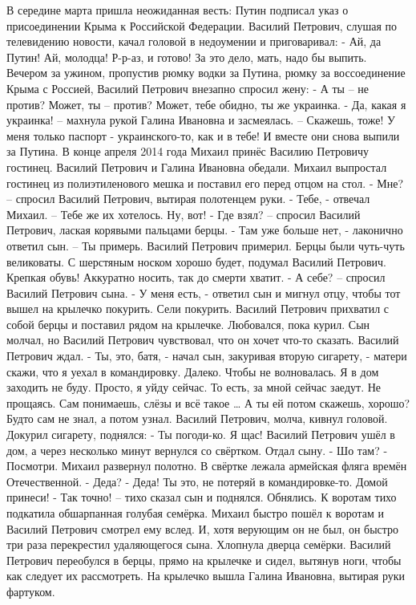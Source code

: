 В середине марта пришла неожиданная весть: Путин подписал указ о присоединении Крыма к Российской Федерации.
Василий Петрович, слушая по телевидению новости, качал головой в недоумении и приговаривал:
- Ай, да Путин! Ай, молодца! Р-р-аз, и готово! За это дело, мать, надо бы выпить.
Вечером за ужином, пропустив рюмку водки за Путина, рюмку за воссоединение Крыма с Россией, Василий Петрович внезапно спросил жену:
- А ты – не против? Может, ты – против? Может, тебе обидно, ты же украинка.
- Да, какая я украинка! – махнула рукой Галина Ивановна и засмеялась. – Скажешь, тоже! У меня только паспорт - украинского-то, как и в тебе!
И вместе они снова выпили за Путина.
В конце апреля 2014 года Михаил принёс Василию Петровичу гостинец. Василий Петрович и Галина Ивановна обедали. Михаил выпростал гостинец из полиэтиленового мешка и поставил его перед отцом на стол.
- Мне? – спросил Василий Петрович, вытирая полотенцем руки.
- Тебе, - отвечал Михаил. – Тебе же их хотелось. Ну, вот!
- Где взял? – спросил Василий Петрович, лаская корявыми пальцами берцы.
- Там уже больше нет, - лаконично ответил сын. – Ты примерь.
Василий Петрович примерил. Берцы были чуть-чуть великоваты. С шерстяным носком хорошо будет, подумал Василий Петрович. Крепкая обувь! Аккуратно носить, так до смерти хватит.
- А себе? – спросил Василий Петрович сына.
- У меня есть, - ответил сын и мигнул отцу, чтобы тот вышел на крылечко покурить.
Сели покурить. Василий Петрович прихватил с собой берцы и поставил рядом на крылечке. Любовался, пока курил. Сын молчал, но Василий Петрович чувствовал, что он хочет что-то сказать. Василий Петрович ждал.
- Ты, это, батя, - начал сын, закуривая вторую сигарету, -  матери скажи, что я уехал в командировку. Далеко. Чтобы не волновалась. Я в дом заходить не буду. Просто, я уйду сейчас. То есть, за мной сейчас заедут. Не прощаясь. Сам понимаешь, слёзы и всё такое … А ты ей потом скажешь, хорошо? Будто сам не знал, а потом узнал.
Василий Петрович, молча, кивнул головой. Докурил сигарету, поднялся:
- Ты погоди-ко. Я щас!
Василий Петрович ушёл в дом, а через несколько минут вернулся со свёртком. Отдал сыну.
- Шо там?
- Посмотри.
Михаил развернул полотно. В свёртке лежала армейская фляга времён Отечественной.
- Деда?
- Деда! Ты это, не потеряй в командировке-то. Домой принеси!
- Так точно! – тихо сказал сын и поднялся. Обнялись. К воротам тихо подкатила обшарпанная голубая семёрка.
Михаил быстро пошёл к воротам и Василий Петрович смотрел ему вслед. И, хотя верующим он не был, он быстро три раза перекрестил удаляющегося сына. Хлопнула дверца семёрки.
Василий Петрович переобулся в берцы, прямо на крылечке и сидел, вытянув ноги, чтобы как следует их рассмотреть. На крылечко вышла Галина Ивановна, вытирая руки фартуком.
